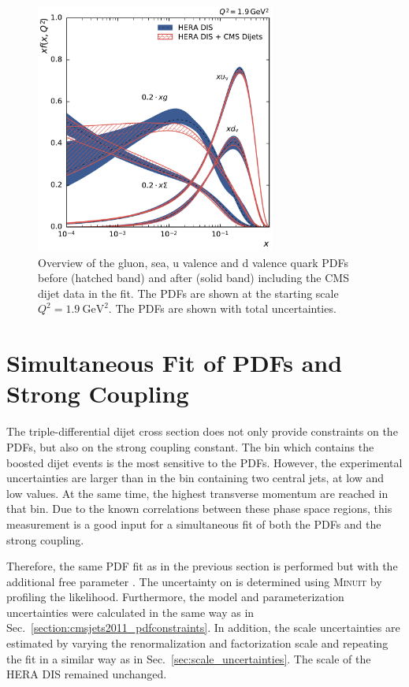 \begin{figure}[tbp]
  \centering
  \includegraphics[width=0.7\textwidth]{figures/pdf_constraints/pdfcomp_direct_overview_1.9.pdf}\hfill%
  \caption[Overview of gluon and quark PDFs]{Overview of the gluon, sea, u
  valence and d valence quark PDFs before (hatched band) and after (solid band)
  including the CMS dijet data in the fit. The PDFs are shown at the starting
  scale $Q^2 = \SI{1.9}{\GeV \squared}$. The PDFs are shown with total
  uncertainties.}
  \label{fig:pdfconstraints:overview:19}
\end{figure}

\section{Simultaneous Fit of PDFs and Strong Coupling}

The triple-differential dijet cross section does not only provide constraints on
the PDFs, but also on the strong coupling constant. The bin which contains the
boosted dijet events is the most sensitive to the PDFs. However, the
experimental uncertainties are larger than in the bin containing two central
jets, \ie at low \yboost and low \ystar values. At the same time, the highest
transverse momentum are reached in that bin. Due to the known correlations
between these phase space regions, this measurement is a good input for a
simultaneous fit of both the PDFs and the strong coupling. 

Therefore, the same PDF fit as in the previous section is performed but with the
additional free parameter \as. The uncertainty on \as is determined using
\textsc{Minuit} by profiling the likelihood. Furthermore, the model and
parameterization uncertainties were calculated in the same way as in
Sec.~\ref{section:cmsjets2011_pdfconstraints}. In addition, the scale
uncertainties are estimated by varying the renormalization and factorization
scale and repeating the fit in a similar way as in
Sec.~\ref{sec:scale_uncertainties}. The scale of the HERA DIS remained
unchanged. 

